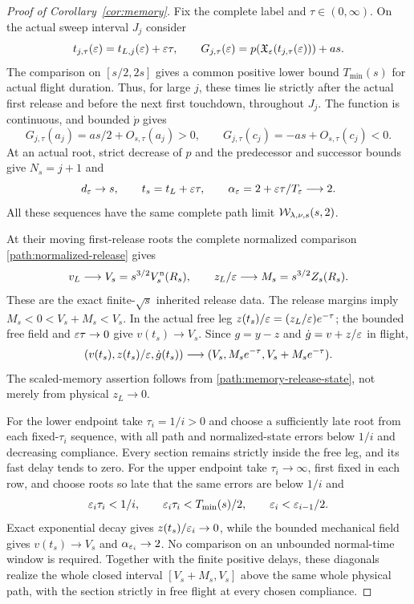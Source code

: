 \begin{proof}[Proof of Corollary~\ref{cor:memory}]
\label{path:memory-proof}
Fix the complete label and $\tau\in(0,\infty)$.  On the actual
sweep interval $J_j$ consider
\[
 t_{j,\tau}(\varepsilon)=t_{L,j}(\varepsilon)+\varepsilon\tau,
 \qquad G_{j,\tau}(\varepsilon)
     =p(\mathfrak X_\varepsilon(t_{j,\tau}(\varepsilon)))+as.
\]
The comparison on $[s/2,2s]$ gives a common positive lower bound
$T_{\min}(s)$ for actual flight duration.  Thus, for large $j$,
these times lie strictly after the actual first release and before
the next first touchdown, throughout $J_j$.  The function is
continuous, and bounded $\dot p$ gives
\[
 G_{j,\tau}(a_j)=as/2+O_{s,\tau}(a_j)>0,
 \qquad G_{j,\tau}(c_j)=-as+O_{s,\tau}(c_j)<0.
\]
At an actual root, strict decrease of $p$ and the predecessor and
successor bounds give $N_s=j+1$ and
\begin{equation}
 d_\varepsilon\to s,\qquad t_s=t_L+\varepsilon\tau,
 \qquad \alpha_\varepsilon=2+\varepsilon\tau/T_\varepsilon\longrightarrow2.
 \label{path:release-delay-root}
\end{equation}
All these sequences have the same complete path limit
$\mathcal W_{\lambda,\nu,s}(s,2)$.

At their moving first-release roots the complete normalized
comparison \eqref{path:normalized-release} gives
\begin{equation}
 v_L\longrightarrow V_s=s^{3/2}V_s^{\rm n}(R_s),\qquad
 z_L/\varepsilon\longrightarrow M_s=s^{3/2}Z_s(R_s).
 \label{path:memory-release-state}
\end{equation}
These are the exact finite-$\sqrt s$ inherited release data.
The release margins imply $M_s<0<V_s+M_s<V_s$.
In the actual free leg $z(t_s)/\varepsilon=(z_L/\varepsilon)e^{-\tau}$;
the bounded free field and $\varepsilon\tau\to0$ give $v(t_s)\to V_s$.
Since $g=y-z$ and $\dot g=v+z/\varepsilon$ in flight,
\begin{equation}
 (v(t_s),z(t_s)/\varepsilon,\dot g(t_s))
       \longrightarrow(V_s,M_se^{-\tau},V_s+M_se^{-\tau}).
 \label{path:memory-observation}
\end{equation}
The scaled-memory assertion follows from
\eqref{path:memory-release-state}, not merely from physical
$z_L\to0$.

For the lower endpoint take $\tau_i=1/i>0$ and choose a sufficiently
late root from each fixed-$\tau_i$ sequence, with all path and
normalized-state errors below $1/i$ and decreasing compliance.
Every section remains strictly inside the free leg, and its fast
delay tends to zero.  For the upper endpoint take
$\tau_i\to\infty$, first fixed in each row, and choose roots so
late that the same errors are below $1/i$ and
\[
 \varepsilon_i\tau_i<1/i,\qquad
 \varepsilon_i\tau_i<T_{\min}(s)/2,\qquad
 \varepsilon_i<\varepsilon_{i-1}/2.
\]
Exact exponential decay gives $z(t_s)/\varepsilon_i\to0$, while the
bounded mechanical field gives $v(t_s)\to V_s$ and
$\alpha_{\varepsilon_i}\to2$.  No comparison on an unbounded normal-time
window is required.  Together with the finite positive delays,
these diagonals realize the whole closed interval
$[V_s+M_s,V_s]$ above the same whole physical path, with the
section strictly in free flight at every chosen compliance.
\end{proof}

